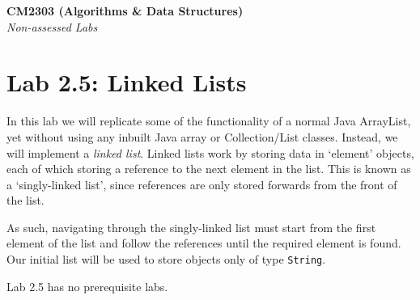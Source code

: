 \documentclass[11pt,a4paper]{report}
\begin{document}
\noindent\Large\textbf{CM2303 (Algorithms \& Data Structures)}\\
\noindent\large\textit{Non-assessed Labs}
\vskip30pt

\section*{Lab 2.5: Linked Lists}

In this lab we will replicate some of the functionality of a normal Java ArrayList, yet without using any inbuilt Java array or Collection/List classes. Instead, we will implement a \textit{linked list}. Linked lists work by storing data in `element' objects, each of which storing a reference to the next element in the list. This is known as a `singly-linked list', since references are only stored forwards from the front of the list.

As such, navigating through the singly-linked list must start from the first element of the list and follow the references until the required element is found. Our initial list will be used to store objects only of type \texttt{String}. 

Lab 2.5 has no prerequisite labs.
\end{document}
